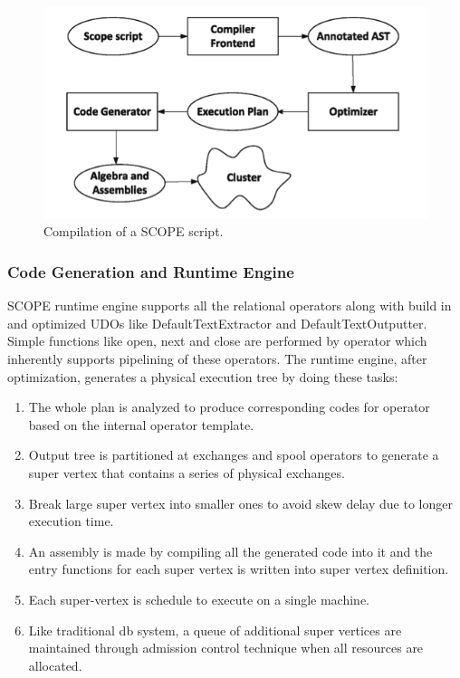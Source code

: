 \documentclass[runningheads,a4paper]{llncs}
\begin{document}
{\begin{figure}[!htb]
	\includegraphics[scale=1]{./images/krunal2}
	\centering
	\caption{Compilation of a SCOPE script.}
	\label{fig:compilation_of_a_scope}
\end{figure}

\subsubsection{Code Generation and Runtime Engine}
SCOPE runtime engine supports all the relational operators along with build in and optimized UDOs like DefaultTextExtractor and DefaultTextOutputter. Simple functions like open, next and close are performed by operator which inherently supports pipelining of these operators.  The runtime engine, after optimization, generates a physical execution tree by doing these tasks:
\begin{enumerate}
	\item The whole plan is analyzed to produce corresponding codes for operator based on the internal operator template.
	\item  Output tree is partitioned at exchanges and spool operators to generate a super vertex that contains a series of physical exchanges.
	\item Break large super vertex into smaller ones to avoid skew delay due to longer execution time.
	\item An assembly is made by compiling all the generated code into it and the entry functions for each super vertex is written into super vertex definition.
	\item Each super-vertex is schedule to execute on a single machine.
	\item Like traditional db system, a queue of additional super vertices are maintained through admission control technique when all resources are allocated.
\end{enumerate}

}
\end{document}
